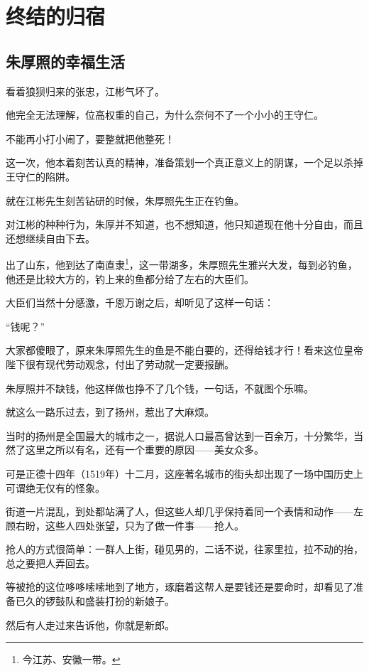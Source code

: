 \section{终结的归宿}
\ifnum{}
	\begin{multicols}{\theparacolNo}
		\fi
		\subsection{朱厚照的幸福生活}
		看着狼狈归来的张忠，江彬气坏了。

		他完全无法理解，位高权重的自己，为什么奈何不了一个小小的王守仁。

		不能再小打小闹了，要整就把他整死！

		这一次，他本着刻苦认真的精神，准备策划一个真正意义上的阴谋，一个足以杀掉王守仁的陷阱。

		就在江彬先生刻苦钻研的时候，朱厚照先生正在钓鱼。

		对江彬的种种行为，朱厚并不知道，也不想知道，他只知道现在他十分自由，而且还想继续自由下去。

		出了山东，他到达了南直隶\footnote{今江苏、安徽一带。}，这一带湖多，朱厚照先生雅兴大发，每到必钓鱼，他还是比较大方的，钓上来的鱼都分给了左右的大臣们。

		大臣们当然十分感激，千恩万谢之后，却听见了这样一句话：

		“钱呢？”

		大家都傻眼了，原来朱厚照先生的鱼是不能白要的，还得给钱才行！看来这位皇帝陛下很有现代劳动观念，付出了劳动就一定要报酬。

		朱厚照并不缺钱，他这样做也挣不了几个钱，一句话，不就图个乐嘛。

		就这么一路乐过去，到了扬州，惹出了大麻烦。

		当时的扬州是全国最大的城市之一，据说人口最高曾达到一百余万，十分繁华，当然了这里之所以有名，还有一个重要的原因——美女众多。

		可是正德十四年（1519年）十二月，这座著名城市的街头却出现了一场中国历史上可谓绝无仅有的怪象。

		街道一片混乱，到处都站满了人，但这些人却几乎保持着同一个表情和动作——左顾右盼，这些人四处张望，只为了做一件事——抢人。

		抢人的方式很简单：一群人上街，碰见男的，二话不说，往家里拉，拉不动的抬，总之要把人弄回去。

		等被抢的这位哆哆嗦嗦地到了地方，琢磨着这帮人是要钱还是要命时，却看见了准备已久的锣鼓队和盛装打扮的新娘子。

		然后有人走过来告诉他，你就是新郎。


\end{multicols}
